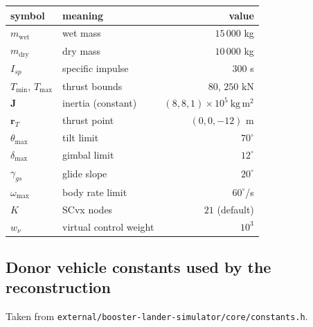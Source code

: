 \documentclass[11pt,a4paper]{article}
\newcommand{\vect}[1]{\mathbf{#1}}
\newcommand{\code}[1]{\texttt{#1}}
\begin{document}
\begin{center}
\begin{tabular}{llr}
\toprule
symbol & meaning & value \\
\midrule
$m_{\mathrm{wet}}$ & wet mass & $15\,000$ kg \\
$m_{\mathrm{dry}}$ & dry mass & $10\,000$ kg \\
$I_{sp}$ & specific impulse & $300$ s \\
$T_{\min}$, $T_{\max}$ & thrust bounds & $80$, $250$ kN \\
$\vect{J}$ & inertia (constant) & $(8, 8, 1)\times10^5\ \mathrm{kg\,m^2}$ \\
$\vect{r}_T$ & thrust point & $(0,0,-12)$ m \\
$\theta_{\max}$ & tilt limit & $70^\circ$ \\
$\delta_{\max}$ & gimbal limit & $12^\circ$ \\
$\gamma_{gs}$ & glide slope & $20^\circ$ \\
$\omega_{\max}$ & body rate limit & $60^\circ$/s \\
$K$ & SCvx nodes & $21$ (default) \\
$w_\nu$ & virtual control weight & $10^3$ \\
\bottomrule
\end{tabular}
\end{center}

\subsection{Donor vehicle constants used by the reconstruction}

Taken from \code{external/booster-lander-simulator/core/constants.h}.
\end{document}

